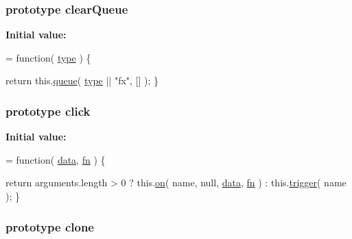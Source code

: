 \subsubsection[{clear\+Queue}]{ {\bf prototype} clear\+Queue}\label{jquery-1_810_82-vsdoc_8js_ad0cc4718ee86b70a5fee95ed96e57fef}
{\bfseries Initial value\+:}
\begin{DoxyCode}
= \textcolor{keyword}{function}( \hyperlink{jquery-1_810_82-vsdoc_8js_a3940565e83a9bfd10d95ffd27536da91}{type} ) \{


        \textcolor{keywordflow}{return} this.\hyperlink{jquery-1_810_82-vsdoc_8js_a4a4ce67ab280eb2cff0622a3bdc1f5b3}{queue}( \hyperlink{jquery-1_810_82-vsdoc_8js_a3940565e83a9bfd10d95ffd27536da91}{type} || \textcolor{stringliteral}{"fx"}, [] );
    \}
\end{DoxyCode}
\hypertarget{jquery-1_810_82-vsdoc_8js_ae91d3cae9d03efb8a330aaed1fc421c7}{}
\subsubsection[{click}]{ {\bf prototype} click}\label{jquery-1_810_82-vsdoc_8js_ae91d3cae9d03efb8a330aaed1fc421c7}
{\bfseries Initial value\+:}
\begin{DoxyCode}
= \textcolor{keyword}{function}( \hyperlink{jquery-1_810_82-vsdoc_8js_a609407b3456fdc3c5671a9fc4a226ff7}{data}, \hyperlink{jquery-1_810_82-vsdoc_8js_acef6bdaf6b9b20fdcca1ea86f0902c3b}{fn} ) \{


        \textcolor{keywordflow}{return} arguments.length > 0 ?
            this.\hyperlink{jquery-1_810_82-vsdoc_8js_ae453b412b883f60220d73468ef6c6dbc}{on}( name, null, \hyperlink{jquery-1_810_82-vsdoc_8js_a609407b3456fdc3c5671a9fc4a226ff7}{data}, \hyperlink{jquery-1_810_82-vsdoc_8js_acef6bdaf6b9b20fdcca1ea86f0902c3b}{fn} ) :
            this.\hyperlink{jquery-1_810_82-vsdoc_8js_a2388c4114d5e3e4eab020f973641519c}{trigger}( name );
    \}
\end{DoxyCode}
\hypertarget{jquery-1_810_82-vsdoc_8js_a7d74ce76585989b4b6e2d506577e13ad}{}
\subsubsection[{clone}]{ {\bf prototype} clone}\label{jquery-1_810_82-vsdoc_8js_a7d74ce76585989b4b6e2d506577e13ad}
\hypertarget{jquery-1_810_82-vsdoc_8js_aff450c9c255a1867a5677efa5bed8765}{}
